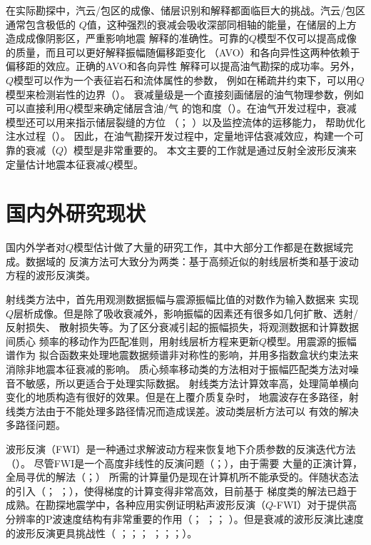 在实际勘探中，汽云/包区的成像、储层识别和解释都面临巨大的挑战。汽云/包区通常包含极低的
$Q$值，这种强烈的衰减会吸收深部同相轴的能量，在储层的上方造成成像阴影区，严重影响地震
解释的准确性。可靠的$Q$模型不仅可以提高成像的质量，而且可以更好解释振幅随偏移距变化
（AVO）和各向异性这两种依赖于偏移距的效应。正确的AVO和各向异性
解释可以提高油气勘探的成功率。另外，$Q$模型可以作为一个表征岩石和流体属性的参数，
例如在稀疏井约束下，可以用$Q$模型来检测岩性的边界（）。
衰减量级是一个直接刻画储层的油气物理参数，例如可以直接利用$Q$模型来确定储层含油/气
的饱和度（）。在油气开发过程中，衰减模型还可以用来指示储层裂缝的方位
（； ）以及监控流体的运移能力，
帮助优化注水过程（）。
因此，在油气勘探开发过程中，定量地评估衰减效应，构建一个可靠的衰减（$Q$）模型是非常重要的。
本文主要的工作就是通过反射全波形反演来定量估计地震本征衰减$Q$模型。

\vspace{1.2cm}
\section{国内外研究现状}
\vspace{0.4cm}

国内外学者对$Q$模型估计做了大量的研究工作，其中大部分工作都是在数据域完成。数据域的
反演方法可大致分为两类：基于高频近似的射线层析类和基于波动方程的波形反演类。

射线类方法中，首先用观测数据振幅与震源振幅比值的对数作为输入数据来
实现$Q$层析成像。但是除了吸收衰减外，影响振幅的因素还有很多如几何扩散、透射/反射损失、
散射损失等。为了区分衰减引起的振幅损失，将观测数据和计算数据间质心
频率的移动作为匹配准则，用射线层析方程来更新$Q$模型。用震源的振幅谱作为
拟合函数来处理地震数据频谱非对称性的影响，并用多指数盒状约束法来消除非地震本征衰减的影响。
质心频率移动类的方法相对于振幅匹配类方法对噪音不敏感，所以更适合于处理实际数据。
射线类方法计算效率高，处理简单横向变化的地质构造有很好的效果。但是在上覆介质复杂时，
地震波存在多路径，射线类方法由于不能处理多路径情况而造成误差。波动类层析方法可以
有效的解决多路径问题。

波形反演（FWI）是一种通过求解波动方程来恢复地下介质参数的反演迭代方法（）。
尽管FWI是一个高度非线性的反演问题（；），由于需要
大量的正演计算，全局寻优的解法（；）
所需的计算量仍是现在计算机所不能承受的。伴随状态法的引入（；
；），使得梯度的计算变得非常高效，目前基于
梯度类的解法已趋于成熟。在勘探地震学中，各种应用实例证明粘声波形反演（$Q$-FWI）对于提供高
分辨率的P波速度结构有非常重要的作用（； 
；； ）。但是衰减的波形反演比速度的波形反演更具挑战性（
；；； 
；；；）。

